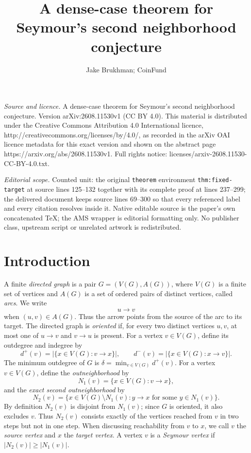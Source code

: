 \documentclass[10pt,a4paper]{amsart}
\begin{document}
\title[A dense-case theorem for Seymour's second neighborhood conje]{A dense-case theorem for Seymour's second neighborhood conjecture}
\author{Jake Brukhman; CoinFund}
\date{}
\maketitle
\noindent\emph{Source and licence.} A dense-case theorem for Seymour's second neighborhood conjecture. Version arXiv:2608.11530v1 (CC BY 4.0). This material is distributed under the Creative Commons Attribution 4.0 International licence, http://creativecommons.org/licenses/by/4.0/, as recorded in the arXiv OAI licence metadata for this exact version and shown on the abstract page https://arxiv.org/abs/2608.11530v1. Full rights notice: licenses/arxiv-2608.11530-CC-BY-4.0.txt.\par\smallskip
\noindent\textit{Editorial scope.} Counted unit: the original \texttt{theorem} environment \texttt{thm:fixed-target} at source lines 125--132 together with its complete proof at lines 237--299; the delivered document keeps source lines 69--300 so that every referenced label and every citation resolves inside it. Native editable source is the paper's own concatenated TeX; the AMS wrapper is editorial formatting only. No publisher class, upstream script or unrelated artwork is redistributed.
\section{Introduction}

A finite \emph{directed graph} is a pair
$G=(V(G),A(G))$, where $V(G)$ is a finite set of vertices and
$A(G)$ is a set of ordered pairs of distinct vertices, called \emph{arcs}.
We write
\[
 u\to v
\]
when $(u,v)\in A(G)$.  Thus the arrow points from the source of the arc to
its target.  The directed graph is \emph{oriented} if, for every two distinct
vertices $u,v$, at most one of $u\to v$ and $v\to u$ is present. For a vertex $v\in V(G)$, define its outdegree and indegree by
\[
 d^+(v)=|\{x\in V(G):v\to x\}|,
 \qquad
 d^-(v)=|\{x\in V(G):x\to v\}|.
\]
The minimum outdegree of $G$ is
$\delta=\min_{v\in V(G)}d^+(v).$ For a vertex $v\in V(G)$, define the \emph{outneighborhood} by
\[
 N_1(v)=\{x\in V(G):v\to x\},
\]
and the \emph{exact second outneighborhood} by
\[
 N_2(v)=
 \{x\in V(G)\setminus N_1(v):
   y\to x\text{ for some }y\in N_1(v)\}.
\]
By definition $N_2(v)$ is disjoint from $N_1(v)$; since $G$ is oriented, it also excludes $v$. Thus $N_2(v)$ consists exactly of the vertices reached from $v$ in two steps but not in one step.  When discussing reachability from $v$ to $x$, we call $v$ the \emph{source vertex} and $x$ the \emph{target vertex}. A vertex $v$ is a \emph{Seymour vertex} if $|N_2(v)|\ge|N_1(v)|.$
\end{document}
